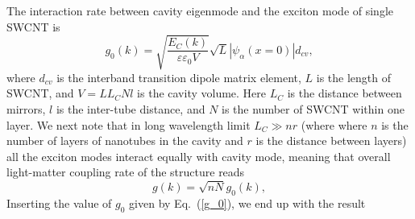 \documentclass[journal=aamick,manuscript=article]{achemso}
\begin{document}
The interaction rate between cavity eigenmode and the exciton mode of single SWCNT is \cite{Burstein}
%
\begin{equation}
\label{g_0}
g_{0}(k)=\sqrt{\frac{E_C(k)}{\varepsilon \varepsilon_0 V}} \sqrt{L} |\psi_{\alpha} (x=0)| d_{cv},
\end{equation}
%
where $d_{cv}$ is the interband transition dipole matrix element, $L$ is the length of SWCNT, and $V=LL_C Nl$ is the cavity volume. Here $L_C$ is the distance between mirrors, $l$ is the inter-tube distance, and $N$ is the number of SWCNT within one layer. We next note that in long wavelength limit $L_C\gg n r$ (where where $n$ is the number of layers of nanotubes in the cavity and $r$ is the distance between layers) all the exciton modes interact equally  with cavity mode, meaning that overall light-matter coupling rate of the structure reads~\cite{Fox_QUANT}
%
\begin{equation}
g(k)=\sqrt{nN}g_0(k),
\end{equation}
%
 Inserting the value of $g_0$ given by Eq.~(\ref{g_0}), we end up with the result

\begin{comment}
The interaction rate between a cavity eigenmode of electric field strength $E_{\text{vac}}$ and an ensemble of $N$ oscillators each having an interband transition (conduction-valence) dipole moment of $d_{cv}$ is~\cite{Fox_QUANT}.
%
\begin{equation}
	\label{Rabi-1}
  	g(k)=\sqrt{N} d_{cv} E_{\text{vac}}.
\end{equation}
%
\noindent The cavity vacuum field strength is \cite{Fox_QUANT} $E_{\text{vac}}=\sqrt{\hbar\omega/\varepsilon_0\varepsilon V}$ where $V$ is the cavity volume. For $\hbar\omega = E_C$, the cavity mode energy, and for $V = A L_C$, where $L_C$ is the cavity length and $A$ is the effective cavity mode area, then the vacuum field strength is,
%
\begin{equation}
	\label{E-vac}
	E_{\text{vac}} = \sqrt\frac{E_C}{\varepsilon_0\varepsilon A L_C}.
\end{equation}
%
To estimate the number of emitters (excitons) in the cavity volume, $N$, we need to know the density with which they occur along each nanotube. For the lowest 1D excitonic wavefunction the spatial extent, $D_X$ of the exciton can be estimated from $|\psi_{\alpha}(x=0)|^2 D_X=1$. The number of emitters in the cavity volume is thus,
%
\begin{equation}
	\label{number}
	N = n\frac{A}{lD_X}=n \frac{A |\psi_{\alpha}(x=0)|^2}{l},
\end{equation}
%
\noindent where we recall that $n$ is the number of layers of nanotubes in the cavity and $l$ is the inter-tube distance. Combining Eqs (\ref{Rabi-1}),(\ref{E-vac}) and (\ref{number}), the cavity-exciton interaction rate can be written as,
\end{comment}
\end{document}
